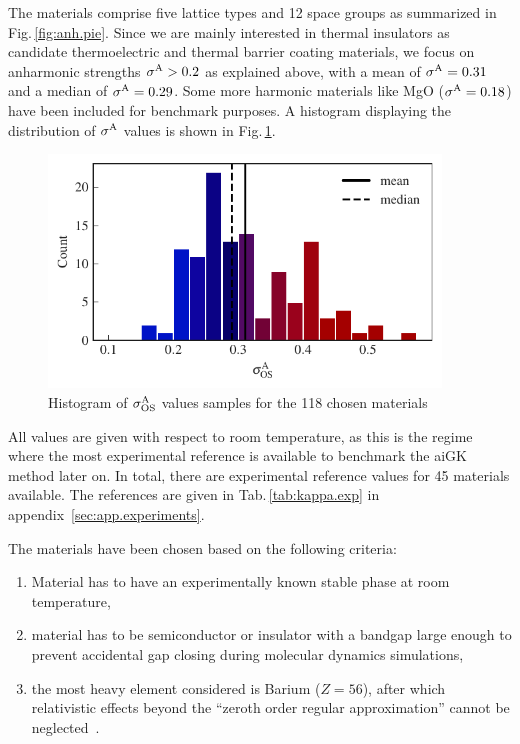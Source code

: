 The materials comprise five lattice types and 12 space groups as summarized in Fig.\,\ref{fig:anh.pie}.
Since we are mainly interested in thermal insulators as candidate thermoelectric and thermal barrier coating materials, we focus on anharmonic strengths $\sigma^\mathrm{A} > 0.2$ as explained above, with a mean of $\sigma^\mathrm{A}=0.31$ and a median of $\sigma^\mathrm{A} = 0.29$. Some more harmonic materials like MgO ($\sigma^\mathrm{A} = 0.18$) have been included for benchmark purposes. A histogram displaying the distribution of $\sigma^\mathrm{A}$ values is shown in Fig.\,\ref{fig:anh.histogram}.
\begin{figure}
	\includegraphics[width=4.1in]{./data/plots/dataset/histogram.pdf}
	\caption{
		Histogram of $\sigma^\mathrm{A}_\mathrm{OS}$ values samples for the 118 chosen materials
	}
	\label{fig:anh.histogram}
\end{figure}
All values are given with respect to room temperature, as this is the regime where the most experimental reference is available to benchmark the aiGK method later on. In total, there are experimental reference values for 45 materials available. The references are given in Tab.\,\ref{tab:kappa.exp} in appendix~\ref{sec:app.experiments}.


The materials have been chosen based on the following criteria:
\begin{enumerate}
	\item Material has to have an experimentally known stable phase at room temperature,
	\item material has to be semiconductor or insulator with a bandgap large enough to prevent accidental gap closing during molecular dynamics simulations,
	\item the most heavy element considered is Barium ($Z=56$), after which relativistic effects beyond the ``zeroth order regular approximation'' cannot be neglected~\cite{Vanlenthe.1994,Huhn.2017,Zhao.2021}.
\end{enumerate}

